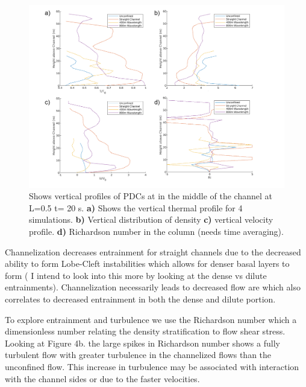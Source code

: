 \begin{figure}[ht]
 \centering
 \includegraphics[width= \linewidth]{vertical.png}
 \caption{ Shows vertical profiles of PDCs at in the middle of the channel at L=0.5 t= 20 s.  \textbf{a)} Shows the vertical thermal profile for 4 simulations.  \textbf{b)} Vertical distribution of density \textbf{c)} vertical velocity profile.  \textbf{d)} Richardson number in the column (needs time averaging).}
 \label{fig:vert} 
\end{figure}
Channelization decreases entrainment for straight channels due to the decreased ability to form Lobe-Cleft instabilities which allows for denser basal layers to form ( I intend to look into this more by looking at the dense vs dilute entrainments). Channelization necessarily leads to decreased flow are which also correlates to decreased entrainment in both the dense and dilute portion. 

To explore entrainment and turbulence we use the Richardson number which a dimensionless number relating the density stratification to flow shear stress. Looking at Figure 4b. the large spikes in Richardson number shows a fully turbulent flow with greater turbulence in the channelized flows than the unconfined flow. This increase in turbulence may be associated with interaction with the channel sides or due to the faster velocities.

